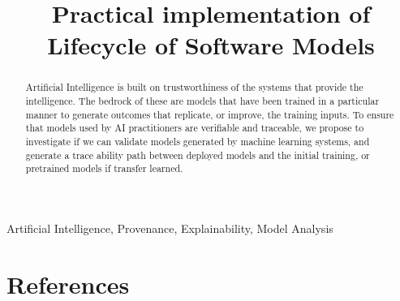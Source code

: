 \documentclass[conference]{IEEEtran}
\begin{document}
\title{
Practical implementation of Lifecycle of Software Models
}

\author{

}

\maketitle

\begin{abstract}
Artificial Intelligence is built on trustworthiness of the systems that provide the intelligence.
The bedrock of these are models that have been trained in a particular manner to generate outcomes that replicate, or improve, the training inputs. To ensure that models used by AI practitioners are verifiable and traceable, we propose to investigate if we can validate models generated by machine learning systems, and generate a trace ability path between deployed models and the initial training, or pretrained models if transfer learned.
\end{abstract}

\begin{IEEEkeywords}
Artificial Intelligence, Provenance, Explainability, Model Analysis\end{IEEEkeywords}







\section*{References}


\end{document}
